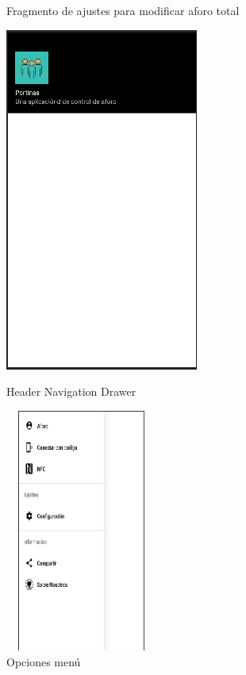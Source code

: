 \documentclass[a4paper,openright,12pt]{article}
\begin{document}
\begin{itemize}
\begin{enumerate}
\begin{itemize}
\begin{figure}[H]
     \caption{Fragmento de ajustes para modificar aforo total}
    \label{fig:my_label}
\end{figure}
\begin{figure}[H]
\centering
\begin{minipage}{.5\textwidth}
  \centering
  \includegraphics[scale=0.7]{header.PNG}
  \caption{Header Navigation Drawer}
  \label{fig:test1}
\end{minipage}%
\begin{minipage}{.5\textwidth}
  \centering
  \includegraphics[width=5cm,height = 8cm]{side.PNG}
  \caption{Opciones menú}
  \label{fig:test2}
\end{minipage}
\end{figure}

\end{itemize}
\end{enumerate}


\end{itemize}
\end{document}
